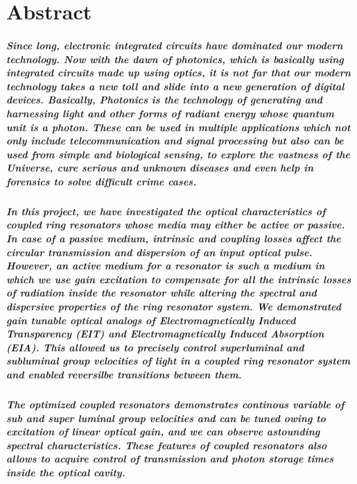 \documentclass[12pt,twoside]{report}
\begin{document}
\chapter*{{\Large Abstract}}
\paragraph{ \normalfont Since long, electronic integrated circuits have dominated our modern technology. Now with the dawn of photonics, which is basically using integrated circuits made up using optics, it is not far that our modern technology takes a new toll and slide into a new generation of digital devices. Basically, Photonics is the technology of generating and harnessing light and other forms of radiant energy whose quantum unit is a photon. These can be used in multiple applications which not only include telecommunication and signal processing but also can be used from simple and biological sensing, to explore the vastness of the Universe, cure serious and unknown diseases and even help in forensics to solve difficult crime cases.}  

\paragraph{\normalfont In this project, we have investigated the optical characteristics of coupled ring resonators whose media may either be active or passive. In case of a passive medium, intrinsic and coupling losses affect the circular transmission and dispersion of an input optical pulse. However, an active medium for a resonator is such a medium in which we use gain excitation to compensate for all the intrinsic losses of radiation inside the resonator while altering the spectral and dispersive properties of the ring resonator system. We demonstrated gain tunable optical analogs of Electromagnetically Induced Transparency (EIT) and Electromagnetically Induced Absorption (EIA). This allowed us to precisely control superluminal and subluminal group velocities of light in a coupled ring resonator system and enabled reversilbe transitions between them.}

\paragraph{\normalfont The optimized coupled resonators demonstrates continous variable of sub and super luminal group velocities and can be tuned owing to excitation of linear optical gain, and we can observe astounding spectral characteristics. These features of coupled resonators also allows to acquire control of transmission and photon storage times inside the optical cavity.}
\end{document}

